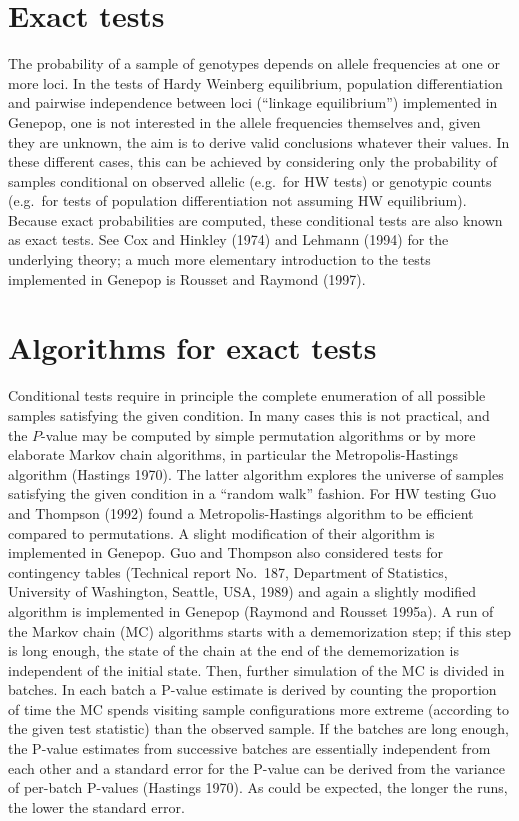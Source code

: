 \documentclass[
  12pt,
]{book}
\begin{document}
\hypertarget{exact-tests}{%
\section{Exact tests}\label{exact-tests}}

The probability of a sample of genotypes depends on allele frequencies at one or more loci. In the tests of Hardy Weinberg equilibrium, population differentiation and pairwise independence between loci (``linkage equilibrium'') implemented in Genepop, one is not interested in the allele frequencies themselves and, given they are unknown, the aim is to derive valid conclusions whatever their values. In these different cases, this can be achieved by considering only the probability of samples conditional on observed allelic (e.g.~for HW tests) or genotypic counts (e.g.~for tests of population differentiation not assuming HW equilibrium). Because exact probabilities are computed, these conditional tests are also known as exact tests. See Cox and Hinkley (1974) and Lehmann (1994) for the underlying theory; a much more elementary introduction to the tests implemented in Genepop is Rousset and Raymond (1997).

\hypertarget{algorithms-for-exact-tests}{%
\section{Algorithms for exact tests}\label{algorithms-for-exact-tests}}

Conditional tests require in principle the complete enumeration of all possible samples satisfying the given condition. In many cases this is not practical, and the \(P\)-value may be computed by simple permutation algorithms or by more elaborate Markov chain algorithms, in particular the Metropolis-Hastings algorithm (Hastings 1970). The latter algorithm explores the universe of samples satisfying the given condition in a ``random walk'' fashion. For HW testing Guo and Thompson (1992) found a Metropolis-Hastings algorithm to be efficient compared to permutations. A slight modification of their algorithm is implemented in Genepop. Guo and Thompson also considered tests for contingency tables (Technical report No.~187, Department of Statistics, University of Washington, Seattle, USA, 1989) and again a slightly modified algorithm is implemented in Genepop (Raymond and Rousset 1995a). A run of the Markov chain (MC) algorithms starts with a dememorization step; if this step is long enough, the state of the chain at the end of the dememorization is independent of the initial state. Then, further simulation of the MC is divided in batches. In each batch a P-value estimate is derived by counting the proportion of time the MC spends visiting sample configurations more extreme (according to the given test statistic) than the observed sample. If the batches are long enough, the P-value estimates from successive batches are essentially independent from each other and a standard error for the P-value can be derived from the variance of per-batch P-values (Hastings 1970). As could be expected, the longer the runs, the lower the standard error.
\end{document}
